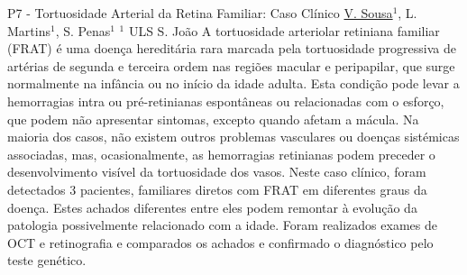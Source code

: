 
    \begin{abstract_online}{P7 - Tortuosidade Arterial da Retina Familiar: Caso Clínico}{%
        \underline{V. Sousa}$^{1}$, L. Martins$^{1}$, S. Penas$^{1}$}{%
        }{%
        $^1$ ULS S. João\newline{}}
        A tortuosidade arteriolar retiniana familiar (FRAT) é uma doença hereditária rara marcada pela tortuosidade progressiva de artérias de segunda e terceira ordem nas regiões macular e peripapilar, que surge normalmente na infância ou no início da idade adulta. Esta condição pode levar a hemorragias intra ou pré-retinianas espontâneas ou relacionadas com o esforço, que podem não apresentar sintomas, excepto quando afetam a mácula. Na maioria dos casos, não existem outros problemas vasculares ou doenças sistémicas associadas, mas, ocasionalmente, as hemorragias retinianas podem preceder o desenvolvimento visível da tortuosidade dos vasos. Neste caso clínico, foram detectados 3 pacientes, familiares diretos com FRAT em diferentes graus da doença. Estes achados diferentes entre eles podem remontar à evolução da patologia possivelmente relacionado com a idade. Foram realizados exames de OCT e retinografia e comparados os achados e confirmado o diagnóstico pelo teste genético.  
    \end{abstract_online}
    